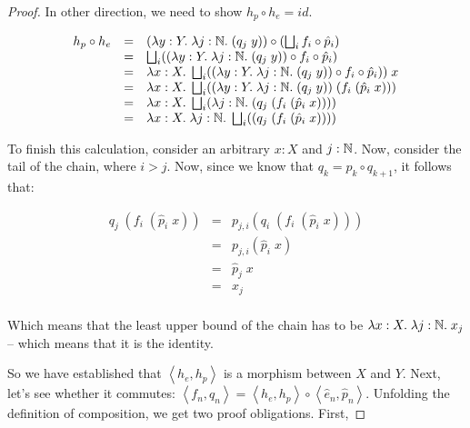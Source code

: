 \begin{proof}
In other direction, we need to show $h_p \circ h_e = id$.

\begin{displaymath}
  \begin{array}{lcl}
    h_p \circ h_e
     & = &  
      (\lambda y:Y.\; \lambda j:\mathbb{N}.\; (q_j\; y)) \circ (\bigsqcup_i f_i \circ \hat{p}_i)
\\
     & = &  
      \bigsqcup_i ((\lambda y:Y.\; \lambda j:\mathbb{N}.\; (q_j\; y)) \circ f_i \circ \hat{p}_i)
\\
     & = &  
      \lambda x:X.\; \bigsqcup_i ((\lambda y:Y.\; \lambda j:\mathbb{N}.\; (q_j\; y)) \circ f_i \circ \hat{p}_i))\;x
\\
     & = &  
      \lambda x:X.\; \bigsqcup_i ((\lambda y:Y.\; \lambda j:\mathbb{N}.\; (q_j\; y))\;(f_i\;(\hat{p}_i\;x)))
\\   
     & = &  
      \lambda x:X.\; \bigsqcup_i (\lambda j:\mathbb{N}.\; (q_j\; (f_i\;(\hat{p}_i\;x))))
\\   
     & = &  
      \lambda x:X.\; \lambda j:\mathbb{N}.\; \bigsqcup_i ((q_j\; (f_i\;(\hat{p}_i\;x))))
  \end{array}
\end{displaymath}

To finish this calculation, consider an arbitrary $x:X$ and $j:\mathbb{N}$. Now, consider
the tail of the chain, where $i > j$. Now, since we know that $q_k = p_k \circ q_{k+1}$, 
it follows that:

\begin{displaymath}
  \begin{array}{lcl}
   q_j\; (f_i\;(\hat{p}_i\;x))
     & = & p_{j,i}(q_i\; (f_i\;(\hat{p}_i\;x))) \\
     & = & p_{j,i}(\hat{p}_i\;x) \\
     & = & \hat{p}_j\;x \\
     & = & x_j \\
  \end{array}
\end{displaymath}

Which means that the least upper bound of the chain has to be 
$\lambda x:X.\;\lambda j:\mathbb{N}.\;x_j$ -- which means that it is the identity.


So we have established that $\left<h_e,h_p\right>$ is a morphism
between $X$ and $Y$. Next, let's see whether it commutes:
$\left<f_n,q_n\right> = \left<h_e,h_p\right> \circ \left<\hat{e}_n,
\hat{p}_n\right>$. Unfolding the definition of composition, we 
get two proof obligations. First, 


\end{proof}

